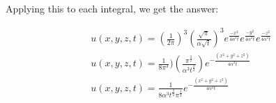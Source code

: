 \documentclass{article}
\begin{document}
Applying this to each integral, we get the answer:
\begin{tcolorbox}[minipage,colback=white,arc=0pt,outer arc=0pt]
\begin{equation}
\begin{aligned}
u(x,y,z,t) = (\frac{1}{2\pi})^3(\frac{\sqrt{\pi}}{\alpha\sqrt{t}})^3e^{\frac{-x^2}{4\alpha^2 t}}e^{\frac{-y^2}{4\alpha^2 t}}e^{\frac{-z^2}{4\alpha^2 t}}\\
u(x,y,z,t) = \frac{1}{8\pi^3})(\frac{\pi^{\frac{3}{2}}}{\alpha^3t^{\frac{3}{2}}})e^{-\frac{(x^2+y^2+z^2)}{4\alpha^2 t}}\\
u(x,y,z,t) = \frac{1}{8\alpha^3 t^{\frac{3}{2}}\pi^{\frac{3}{2}}}e^{-\frac{(x^2+y^2+z^2)}{4\alpha^2 t}}\\
\end{aligned}
\end{equation}
\end{tcolorbox}
\end{document}
